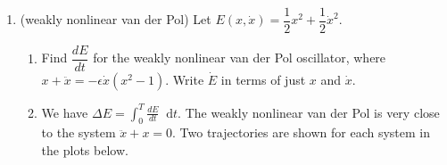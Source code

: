 \documentclass[12pt]{amsart}
\theoremstyle{plain}
\theoremstyle{definition}
\theoremstyle{definition}
\theoremstyle{plain}
\newenvironment{solution}
{\begin{proof}[Solution]}
{\end{proof}}
\newcommand{\dd}{\mathop{}\!\mathrm{d}}
\begin{document}
\begin{enumerate}
\begin{solution}
\begin{enumerate}[label=(\alph*),leftmargin=*]
            \item Along an outer slow branch, $y\approx F(x)$, giving
            \[
                \frac{\dd y}{\dd x}\approx F'(x)=x^2-1,
                \qquad \frac{\dd t}{\dd y}=-\frac{\mu}{x}.
            \]
            Consequently,
            \begin{align*}
                T_{\mathrm{slow}}
                &\approx-\mu\int_{x_1}^{x_2}\frac{x^2-1}{x}\,\dd x\\
                &=-\mu\left[\frac{x^2}{2}-\log|x|\right]_{x_1}^{x_2}.
            \end{align*}
            The integrand now depends only on $x$, and $x$ stays away
            from zero on each outer branch. The endpoints must follow
            the direction of motion. On the right branch $x$ decreases
            from approximately $2$ to $1$, so
            \[
                T_{\mathrm{right}}
                \approx\mu\int_1^2\left(x-\frac1x\right)\,\dd x
                =\mu\left(\frac32-\log2\right)>0.
            \]
            The left branch, traversed from $-2$ to $-1$, takes the
            same time by symmetry. This is a reduced slow-motion
            approximation, not an exact trajectory on $\dot x=0$.

            \item The integral over fixed limiting endpoints is a
            positive constant independent of $\mu$, multiplied by $\mu$.
            Hence $\boxed{k=1}$.

            \item Each slow segment takes time of order $\mu$, whereas
            the fast portion of a jump takes time of order $\mu^{-1}$.
            Their ratio therefore scales as $\mu^{-2}$, so the trajectory
            spends almost all its time on the slow branches. In
            particular, the leading period is
            \[
                \boxed{T\sim(3-2\log2)\mu\qquad(\mu\to\infty).}
            \]
        \end{enumerate}
        \end{solution}

        \setcounter{enumi}{1}
        \item (weakly nonlinear van der Pol) Let $E(x,\dot x)=\dfrac12x^2+\dfrac12\dot x^2$.
        \begin{enumerate}
            \item Find $\dfrac{dE}{dt}$ for the weakly nonlinear van der Pol oscillator, where $x+\ddot x=-\epsilon\dot x(x^2-1)$. Write $\dot E$ in terms of just $x$ and $\dot x$.
            \item We have $\Delta E=\int_0^T\frac{dE}{dt}\dd t$. The weakly nonlinear van der Pol is very close to the system $\ddot x+x=0$. Two trajectories are shown for each system in the plots below.
        \end{enumerate}\end{enumerate}
\end{document}
